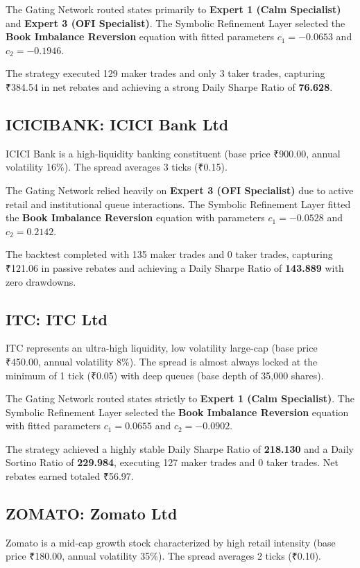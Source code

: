 \documentclass[11pt,a4paper]{article}
\begin{document}
The Gating Network routed states primarily to \textbf{Expert 1 (Calm Specialist)} and \textbf{Expert 3 (OFI Specialist)}. The Symbolic Refinement Layer selected the \textbf{Book Imbalance Reversion} equation with fitted parameters $c_1 = -0.0653$ and $c_2 = -0.1946$.

The strategy executed 129 maker trades and only 3 taker trades, capturing ₹384.54 in net rebates and achieving a strong Daily Sharpe Ratio of \textbf{76.628}.

\subsection{ICICIBANK: ICICI Bank Ltd}
ICICI Bank is a high-liquidity banking constituent (base price ₹900.00, annual volatility 16\%). The spread averages 3 ticks (₹0.15).

The Gating Network relied heavily on \textbf{Expert 3 (OFI Specialist)} due to active retail and institutional queue interactions. The Symbolic Refinement Layer fitted the \textbf{Book Imbalance Reversion} equation with parameters $c_1 = -0.0528$ and $c_2 = 0.2142$.

The backtest completed with 135 maker trades and 0 taker trades, capturing ₹121.06 in passive rebates and achieving a Daily Sharpe Ratio of \textbf{143.889} with zero drawdowns.

\subsection{ITC: ITC Ltd}
ITC represents an ultra-high liquidity, low volatility large-cap (base price ₹450.00, annual volatility 8\%). The spread is almost always locked at the minimum of 1 tick (₹0.05) with deep queues (base depth of 35,000 shares).

The Gating Network routed states strictly to \textbf{Expert 1 (Calm Specialist)}. The Symbolic Refinement Layer selected the \textbf{Book Imbalance Reversion} equation with fitted parameters $c_1 = 0.0655$ and $c_2 = -0.0902$.

The strategy achieved a highly stable Daily Sharpe Ratio of \textbf{218.130} and a Daily Sortino Ratio of \textbf{229.984}, executing 127 maker trades and 0 taker trades. Net rebates earned totaled ₹56.97.

\subsection{ZOMATO: Zomato Ltd}
Zomato is a mid-cap growth stock characterized by high retail intensity (base price ₹180.00, annual volatility 35\%). The spread averages 2 ticks (₹0.10).
\end{document}
